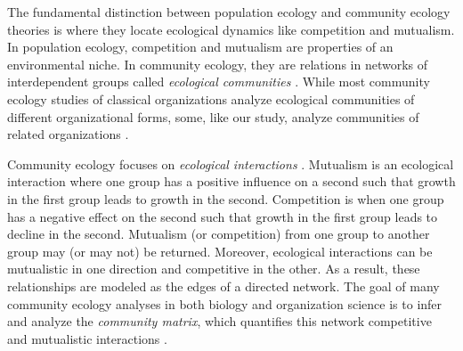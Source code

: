 \documentclass[letterpaper]{article}\usepackage[]{graphicx}\usepackage[]{color}
\begin{document}
The fundamental distinction between population ecology and community ecology theories is where they locate ecological dynamics like competition and mutualism.  In population ecology, competition and mutualism are properties of an environmental niche. In community ecology, they are relations in networks of interdependent groups called \emph{ecological communities} \cite{freeman_community_2006, aldrich_organizations_2006, astley_two_1985}.
While most community ecology studies of classical organizations analyze ecological communities of different organizational forms, some, like our study, analyze communities of related organizations \cite{freeman_community_2006, powell_network_2005, margolin_normative_2012}. 



Community ecology focuses on \emph{ecological interactions} \cite{aldrich_organizations_2006}.
Mutualism is an ecological interaction where one group has a positive influence on a second such that growth in the first group leads to growth in the second.  Competition is when one group has a negative effect on the second such that growth in the first group leads to decline in the second. 
Mutualism (or competition) from one group to another group may (or may not) be returned. Moreover, ecological interactions can be mutualistic in one direction and competitive in the other.    As a result, these relationships are modeled as the edges of a directed network. The goal of many community ecology analyses in 
both biology and organization science is to infer and analyze the \emph{community matrix}, which  quantifies this network competitive and mutualistic interactions \cite{ives_estimating_2003, aldrich_organizations_2006}. 
\end{document}
